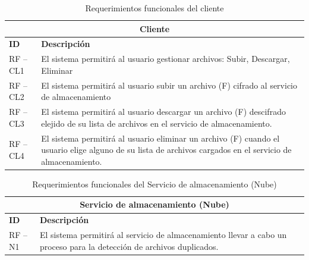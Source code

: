 \begin{table}[htb]
\centering
\begin{tabular}{| p{2cm} |  p{13.5cm} |}
\hline
\multicolumn{2}{|c|}{\textbf{Cliente}} \\ \hline
\textbf{ID} &  \textbf{Descripción} \\
\hline \hline
RF – CL1 & El sistema permitirá al usuario gestionar archivos: Subir, Descargar, Eliminar \\ \hline
RF – CL2 & El sistema permitirá al usuario subir un archivo (F) cifrado al servicio de almacenamiento   \\ \hline
RF – CL3 & El sistema permitirá al usuario descargar un archivo (F) descifrado elejido de su lista de archivos en el servicio de almacenamiento. \\ \hline
RF – CL4 &El sistema permitirá al usuario eliminar un archivo (F) cuando el usuario elige alguno de su lista de archivos cargados en el servicio de almacenamiento.   \\ \hline
\end{tabular}
\caption{Requerimientos funcionales del cliente}
\label{Cliente }
\end{table}


\begin{table}[htb]
\centering
\begin{tabular}{| p{2cm} |  p{13.5cm} |}
\hline
\multicolumn{2}{|c|}{\textbf{Servicio de almacenamiento (Nube)}} \\ \hline
\textbf{ID} &  \textbf{Descripción} \\
\hline \hline

RF – N1 & El sistema permitirá al servicio de almacenamiento llevar a cabo un proceso para la detección de archivos duplicados.  \\ \hline

\end{tabular}
\caption{Requerimientos funcionales del Servicio de almacenamiento (Nube)}
\label{Servicio de almacenamiento (Nube) }
\end{table}
\vspace{9cm}
